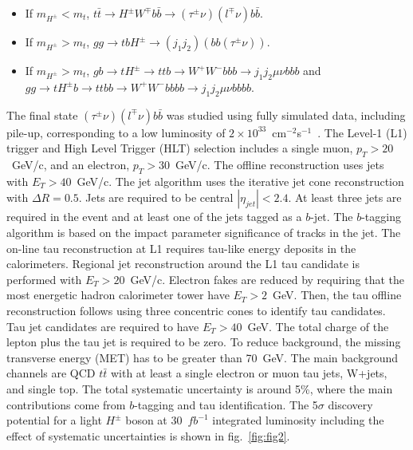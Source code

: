 \documentclass{cimento}
\begin{document}
\begin{itemize}
\item If $m_{H^{\pm}}<m_{t}$, $t\bar{t}\rightarrow H^{\pm}W^{\mp}b\bar{b}\rightarrow (\tau^{\pm}\nu)(l^{\mp}\nu)b\bar{b}$.
\item If $m_{H^{\pm}}>m_{t}$, $gg\rightarrow tbH^{\pm}\rightarrow (j_{1}j_{2})(bb(\tau^{\pm}\nu))$.
\item If $m_{H^{\pm}}>m_{t}$, $gb\rightarrow tH^{\pm} \rightarrow ttb \rightarrow W^+W^-bbb\rightarrow j_1j_2\mu\nu bbb$ and $gg\rightarrow tH^{\pm}b \rightarrow ttbb \rightarrow W^+W^-bbbb\rightarrow j_1j_2\mu\nu bbbb$.
\end{itemize}

  


The final state $(\tau^{\pm}\nu)(l^{\mp}\nu)b\bar{b}$ was studied using fully
simulated data, including pile-up, corresponding to a low luminosity of 
$2\times10^{33}$~cm$^{-2}$s$^{-1}$~\cite{ref:tauLepAna}. The Level-1 (L1) trigger and High Level Trigger (HLT) selection
includes a single muon, $p_{T}>20$~GeV/c, and an electron, $p_{T}>30$~GeV/c.
The offline reconstruction uses jets with $E_{T}>40$~GeV/c. The jet
algorithm uses the iterative jet cone reconstruction with $\Delta R=0.5$.
Jets are required to be central $| \eta_{jet}|<2.4$. At least three jets are
required in the event and at least one of the jets tagged as a $b$-jet. The 
$b$-tagging algorithm is based on the impact parameter significance of tracks in the jet.
The on-line tau reconstruction at L1 requires tau-like energy deposits 
in the calorimeters. Regional jet reconstruction around the L1 tau candidate
is performed with $E_{T}>20$~GeV/c. Electron fakes are reduced by requiring
that the most energetic hadron calorimeter tower have $E_{T}>2$~GeV. Then, the tau offline
reconstruction follows using three concentric cones to identify tau candidates.
Tau jet candidates are required to have $E_{T}>40$~GeV. The total charge of the
lepton plus the tau jet is required to be zero. To reduce background,
the missing transverse energy (MET) has to be greater than 70~GeV. The main 
background channels are QCD $t\bar{t}$ with at least a single electron or muon
tau jets, W+jets, and single top. The total systematic uncertainty is 
around 5\%, where the main contributions come from $b$-tagging and tau identification.
The 5$\sigma$ discovery potential for a light $H^{\pm}$ boson at 30~$fb^{-1}$
integrated luminosity including the effect of systematic uncertainties is shown in fig.~\ref{fig:fig2}.
\end{document}
